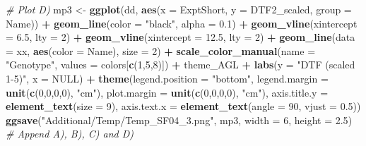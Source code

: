 \documentclass[
]{article}
\newenvironment{Shaded}{\begin{snugshade}}{\end{snugshade}}
\newcommand{\CommentTok}[1]{\textcolor[rgb]{0.56,0.35,0.01}{\textit{#1}}}
\newcommand{\DataTypeTok}[1]{\textcolor[rgb]{0.13,0.29,0.53}{#1}}
\newcommand{\DecValTok}[1]{\textcolor[rgb]{0.00,0.00,0.81}{#1}}
\newcommand{\FloatTok}[1]{\textcolor[rgb]{0.00,0.00,0.81}{#1}}
\newcommand{\KeywordTok}[1]{\textcolor[rgb]{0.13,0.29,0.53}{\textbf{#1}}}
\newcommand{\NormalTok}[1]{#1}
\newcommand{\OperatorTok}[1]{\textcolor[rgb]{0.81,0.36,0.00}{\textbf{#1}}}
\newcommand{\OtherTok}[1]{\textcolor[rgb]{0.56,0.35,0.01}{#1}}
\newcommand{\StringTok}[1]{\textcolor[rgb]{0.31,0.60,0.02}{#1}}
\begin{document}
\begin{Shaded}
\begin{Highlighting}[]
{{{{{{{\CommentTok{# Plot D)}
\NormalTok{mp3 <-}\StringTok{ }\KeywordTok{ggplot}\NormalTok{(dd, }\KeywordTok{aes}\NormalTok{(}\DataTypeTok{x =}\NormalTok{ ExptShort, }\DataTypeTok{y =}\NormalTok{ DTF2_scaled, }\DataTypeTok{group =}\NormalTok{ Name)) }\OperatorTok{+}\StringTok{ }
\StringTok{  }\KeywordTok{geom_line}\NormalTok{(}\DataTypeTok{color =} \StringTok{"black"}\NormalTok{, }\DataTypeTok{alpha =} \FloatTok{0.1}\NormalTok{) }\OperatorTok{+}
\StringTok{  }\KeywordTok{geom_vline}\NormalTok{(}\DataTypeTok{xintercept =} \FloatTok{6.5}\NormalTok{,  }\DataTypeTok{lty =} \DecValTok{2}\NormalTok{) }\OperatorTok{+}\StringTok{ }
\StringTok{  }\KeywordTok{geom_vline}\NormalTok{(}\DataTypeTok{xintercept =} \FloatTok{12.5}\NormalTok{, }\DataTypeTok{lty =} \DecValTok{2}\NormalTok{) }\OperatorTok{+}
\StringTok{  }\KeywordTok{geom_line}\NormalTok{(}\DataTypeTok{data =}\NormalTok{ xx, }\KeywordTok{aes}\NormalTok{(}\DataTypeTok{color =}\NormalTok{ Name), }\DataTypeTok{size =} \DecValTok{2}\NormalTok{) }\OperatorTok{+}\StringTok{ }
\StringTok{  }\KeywordTok{scale_color_manual}\NormalTok{(}\DataTypeTok{name =} \StringTok{"Genotype"}\NormalTok{, }\DataTypeTok{values =}\NormalTok{ colors[}\KeywordTok{c}\NormalTok{(}\DecValTok{1}\NormalTok{,}\DecValTok{5}\NormalTok{,}\DecValTok{8}\NormalTok{)]) }\OperatorTok{+}
\StringTok{  }\NormalTok{theme_AGL }\OperatorTok{+}\StringTok{ }\KeywordTok{labs}\NormalTok{(}\DataTypeTok{y =} \StringTok{"DTF (scaled 1-5)"}\NormalTok{, }\DataTypeTok{x =} \OtherTok{NULL}\NormalTok{) }\OperatorTok{+}
\StringTok{  }\KeywordTok{theme}\NormalTok{(}\DataTypeTok{legend.position =} \StringTok{"bottom"}\NormalTok{, }\DataTypeTok{legend.margin =} \KeywordTok{unit}\NormalTok{(}\KeywordTok{c}\NormalTok{(}\DecValTok{0}\NormalTok{,}\DecValTok{0}\NormalTok{,}\DecValTok{0}\NormalTok{,}\DecValTok{0}\NormalTok{), }\StringTok{"cm"}\NormalTok{),}
        \DataTypeTok{plot.margin =} \KeywordTok{unit}\NormalTok{(}\KeywordTok{c}\NormalTok{(}\DecValTok{0}\NormalTok{,}\DecValTok{0}\NormalTok{,}\DecValTok{0}\NormalTok{,}\DecValTok{0}\NormalTok{), }\StringTok{"cm"}\NormalTok{),}
        \DataTypeTok{axis.title.y =} \KeywordTok{element_text}\NormalTok{(}\DataTypeTok{size =} \DecValTok{9}\NormalTok{),}
        \DataTypeTok{axis.text.x =} \KeywordTok{element_text}\NormalTok{(}\DataTypeTok{angle =} \DecValTok{90}\NormalTok{, }\DataTypeTok{vjust =} \FloatTok{0.5}\NormalTok{))}
\KeywordTok{ggsave}\NormalTok{(}\StringTok{"Additional/Temp/Temp_SF04_3.png"}\NormalTok{, mp3, }\DataTypeTok{width =} \DecValTok{6}\NormalTok{, }\DataTypeTok{height =} \FloatTok{2.5}\NormalTok{)}
\CommentTok{# Append A), B), C) and D)}
}}}}}}}
\end{Highlighting}
\end{Shaded}
\end{document}

